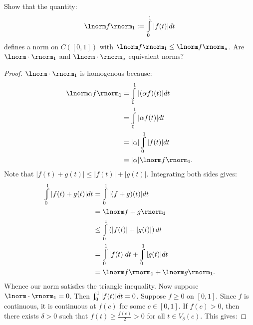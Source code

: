 \documentclass[11pt,twoside,openany]{memoir}
\renewcommand{\int}{\varint}
\begin{document}
    \begin{exercise}
        Show that the quantity:
            \begin{equation*}
            \begin{split}
                \lnorm f \rnorm_1 := \int_0^1 |f(t)|dt
            \end{split}
            \end{equation*}
        defines a norm on $C([0,1])$ with $\lnorm f \rnorm_1 \leq \lnorm f \rnorm_u$. Are $\lnorm \cdot \rnorm_1$ and $\lnorm \cdot \rnorm_u$ equivalent norms?
    \end{exercise}
        \begin{proof}
            $\lnorm \cdot \rnorm_1$ is homogenous because:
                \begin{equation*}
                \begin{split}
                    \lnorm \alpha f \rnorm_1
                    & = \int_0^1 |(\alpha f)(t)| dt \\
                    & = \int_0^1 |\alpha f(t)|dt \\
                    & = |\alpha|\int_0^1 |f(t)|dt \\
                    & = |\alpha| \lnorm f \rnorm_1.
                \end{split}
                \end{equation*}
            Note that $|f(t) + g(t)| \leq |f(t)| + |g(t)|$. Integrating both sides gives:
                \begin{equation*}
                \begin{split}
                    \int_0^1 |f(t) + g(t)|dt
                    & = \int_0^1 |(f+g)(t)|dt \\
                    & = \lnorm f+g \rnorm_1 \\
                    & \leq \int_0^1 \left( |f(t)| + |g(t)| \right)dt \\
                    & = \int_0^1 |f(t)|dt + \int_0^1 |g(t)|dt \\
                    & = \lnorm f \rnorm_1 +\lnorm g \rnorm_1.
                \end{split}
                \end{equation*}
            Whence our norm satisfies the triangle inequality. Now suppose $\lnorm \cdot \rnorm_1 = 0$. Then $\int_0^1 |f(t)|dt = 0$. Suppose $f \geq 0$ on $[0,1]$. Since $f$ is continuous, it is continuous at $f(c)$ for some $c \in [0,1]$. If $f(c) > 0$, then there exists $\delta >0$ such that $f(t) \geq \frac{f(c)}{2} > 0$ for all $t \in V_\delta(c)$. This gives:

\end{proof}
\end{document}
